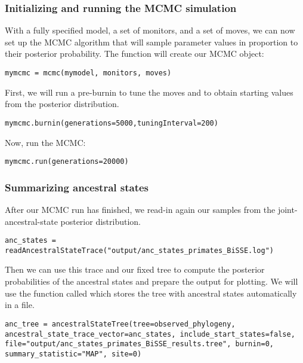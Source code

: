 \subsubsection{Initializing and running the MCMC simulation}

With a fully specified model, a set of monitors, and a set of moves, we can now set up the MCMC algorithm that will sample parameter values in proportion to their posterior probability. 
The  function will create our MCMC object:
{\tt \begin{snugshade*}
\begin{lstlisting}
mymcmc = mcmc(mymodel, monitors, moves)
\end{lstlisting}
\end{snugshade*}}

First, we will run a pre-burnin to tune the moves and to obtain starting values from the posterior distribution.
{\tt \begin{snugshade*}
\begin{lstlisting}
mymcmc.burnin(generations=5000,tuningInterval=200)
\end{lstlisting}
\end{snugshade*}}

Now, run the MCMC:
{\tt \begin{snugshade*}
\begin{lstlisting}
mymcmc.run(generations=20000)
\end{lstlisting}
\end{snugshade*}}

\subsubsection{Summarizing ancestral states}

After our MCMC run has finished, we read-in again our samples from the joint-ancestral-state posterior distribution.
{\tt \begin{snugshade*}
\begin{lstlisting}
anc_states = readAncestralStateTrace("output/anc_states_primates_BiSSE.log")
\end{lstlisting}
\end{snugshade*}}
Then we can use this trace and our fixed tree to compute the posterior probabilities of the ancestral states and prepare the output for plotting.
We will use the function called  which stores the tree with ancestral states automatically in a file.
{\tt \begin{snugshade*}
\begin{lstlisting}
anc_tree = ancestralStateTree(tree=observed_phylogeny, ancestral_state_trace_vector=anc_states, include_start_states=false, file="output/anc_states_primates_BiSSE_results.tree", burnin=0, summary_statistic="MAP", site=0)
\end{lstlisting}
\end{snugshade*}}


